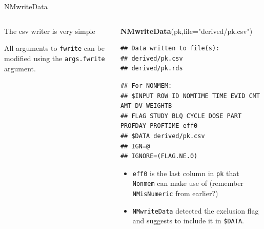 \documentclass[
  8pt,
  ignorenonframetext,
  aspectratio=169]{beamer}
\newenvironment{Shaded}{\begin{snugshade}}{\end{snugshade}}
\newcommand{\DataTypeTok}[1]{\textcolor[rgb]{0.13,0.29,0.53}{#1}}
\newcommand{\KeywordTok}[1]{\textcolor[rgb]{0.13,0.29,0.53}{\textbf{#1}}}
\newcommand{\NormalTok}[1]{#1}
\newcommand{\StringTok}[1]{\textcolor[rgb]{0.31,0.60,0.02}{#1}}
\begin{document}
\begin{frame}[fragile]{NMwriteData}
\begin{columns}[T]
\begin{column}{0.48\textwidth}
\begin{block}{The csv writer is very simple}
\normalsize

All arguments to \texttt{fwrite} can be modified using the
\texttt{args.fwrite} argument.
\end{block}
\end{column}

\begin{column}{0.48\textwidth}
\footnotesize

\begin{Shaded}
\begin{Highlighting}[]
\KeywordTok{NMwriteData}\NormalTok{(pk,}\DataTypeTok{file=}\StringTok{"derived/pk.csv"}\NormalTok{)}
\end{Highlighting}
\end{Shaded}

\begin{verbatim}
## Data written to file(s):
## derived/pk.csv
## derived/pk.rds
\end{verbatim}

\begin{verbatim}
## For NONMEM:
## $INPUT ROW ID NOMTIME TIME EVID CMT AMT DV WEIGHTB
## FLAG STUDY BLQ CYCLE DOSE PART PROFDAY PROFTIME eff0
## $DATA derived/pk.csv
## IGN=@
## IGNORE=(FLAG.NE.0)
\end{verbatim}

\normalsize

\vspace{12pt}

\begin{itemize}
\item
  \texttt{eff0} is the last column in \texttt{pk} that \texttt{Nonmem}
  can make use of (remember \texttt{NMisNumeric} from earlier?)
\item
  \texttt{NMwriteData} detected the exclusion flag and suggests to
  include it in \texttt{\$DATA}.
\end{itemize}
\end{column}
\end{columns}
\end{frame}
\end{document}
